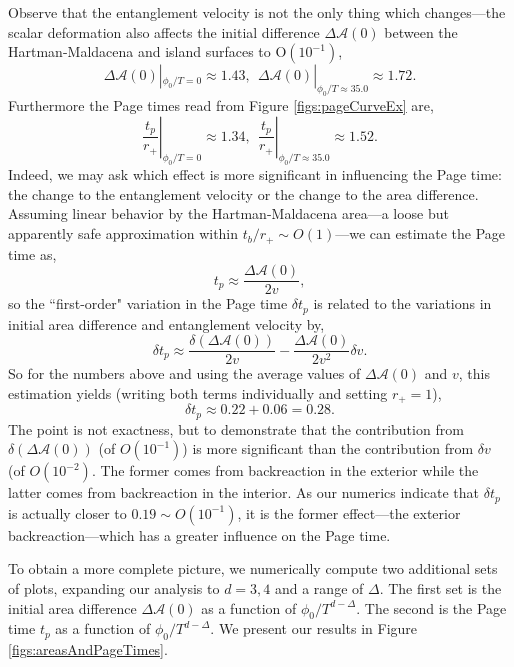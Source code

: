\documentclass[12pt,a4paper]{article}
\begin{document}
Observe that the entanglement velocity is not the only thing which changes---the scalar deformation also affects the initial difference $\Delta\mathcal{A}(0)$ between the Hartman-Maldacena and island surfaces to O$(10^{-1})$,
\begin{equation}
\Delta\mathcal{A}(0)|_{\phi_0/T = 0} \approx 1.43,\ \ \Delta\mathcal{A}(0)|_{\phi_0/T \approx 35.0} \approx 1.72.
\end{equation}
Furthermore the Page times read from Figure \ref{figs:pageCurveEx} are,
\begin{equation}
\left.\frac{t_p}{r_+}\right|_{\phi_0/T = 0} \approx 1.34,\ \ \left.\frac{t_p}{r_+}\right|_{\phi_0/T \approx 35.0} \approx 1.52.
\end{equation}
Indeed, we may ask which effect is more significant in influencing the Page time: the change to the entanglement velocity or the change to the area difference. Assuming linear behavior by the Hartman-Maldacena area---a loose but apparently safe approximation within $t_b/r_+ \sim O(1)$---we can estimate the Page time as,
\begin{equation}
t_p \approx \frac{\Delta\mathcal{A}(0)}{2v},
\end{equation}
so the ``first-order" variation in the Page time $\delta t_p$ is related to the variations in initial area difference and entanglement velocity by,
\begin{equation}
\delta t_p \approx \frac{\delta(\Delta\mathcal{A}(0))}{2v} - \frac{\Delta\mathcal{A}(0)}{2v^2} \delta v.\label{varTP}
\end{equation}
So for the numbers above and using the average values of $\Delta\mathcal{A}(0)$ and $v$, this estimation yields (writing both terms individually and setting $r_+ = 1$),
\begin{equation}
\delta t_p \approx 0.22 + 0.06 = 0.28.
\end{equation}
The point is not exactness, but to demonstrate that the contribution from $\delta(\Delta\mathcal{A}(0))$ (of $O(10^{-1})$) is more significant than the contribution from $\delta v$ (of $O(10^{-2})$. The former comes from backreaction in the exterior while the latter comes from backreaction in the interior. As our numerics indicate that $\delta t_p$ is actually closer to $0.19 \sim O(10^{-1})$, it is the former effect---the exterior backreaction---which has a greater influence on the Page time.

To obtain a more complete picture, we numerically compute two additional sets of plots, expanding our analysis to $d = 3,4$ and a range of $\Delta$. The first set is the initial area difference $\Delta \mathcal{A}(0)$ as a function of $\phi_0/T^{d-\Delta}$. The second is the Page time $t_p$ as a function of $\phi_0/T^{d-\Delta}$. We present our results in Figure \ref{figs:areasAndPageTimes}.
\end{document}
